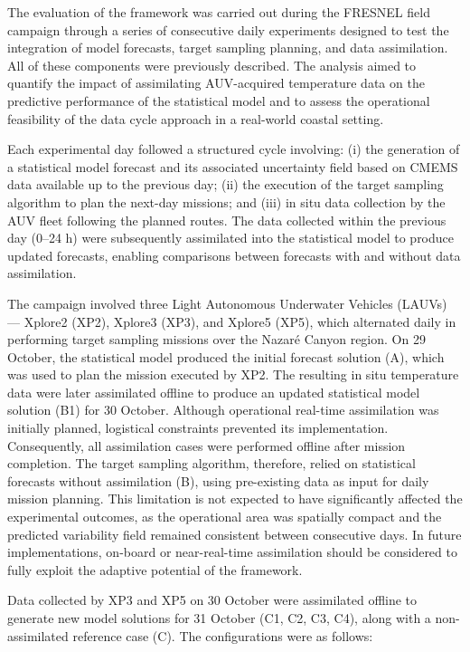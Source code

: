 The evaluation of the framework was carried out during the FRESNEL field campaign through a series of consecutive daily experiments designed to test the integration of model forecasts, target sampling planning, and data assimilation. All of these components were previously described. The analysis aimed to quantify the impact of assimilating AUV-acquired temperature data on the predictive performance of the statistical model and to assess the operational feasibility of the data cycle approach in a real-world coastal setting.

Each experimental day followed a structured cycle involving: (i) the generation of a statistical model forecast and its associated uncertainty field based on CMEMS data available up to the previous day; (ii) the execution of the target sampling algorithm to plan the next-day missions; and (iii) in situ data collection by the AUV fleet following the planned routes. The data collected within the previous day (0–24 h) were subsequently assimilated into the statistical model to produce updated forecasts, enabling comparisons between forecasts with and without data assimilation.

The campaign involved three Light Autonomous Underwater Vehicles (LAUVs) — Xplore2 (XP2), Xplore3 (XP3), and Xplore5 (XP5), which alternated daily in performing target sampling missions over the Nazaré Canyon region. On 29 October, the statistical model produced the initial forecast solution (A), which was used to plan the mission executed by XP2. The resulting in situ temperature data were later assimilated offline to produce an updated statistical model solution (B1) for 30 October. Although operational real-time assimilation was initially planned, logistical constraints prevented its implementation. Consequently, all assimilation cases were performed offline after mission completion. The target sampling algorithm, therefore, relied on statistical forecasts without assimilation (B), using pre-existing data as input for daily mission planning. This limitation is not expected to have significantly affected the experimental outcomes, as the operational area was spatially compact and the predicted variability field remained consistent between consecutive days. In future implementations, on-board or near-real-time assimilation should be considered to fully exploit the adaptive potential of the framework.

Data collected by XP3 and XP5 on 30 October were assimilated offline to generate new model solutions for 31 October (C1, C2, C3, C4), along with a non-assimilated reference case (C). The configurations were as follows:


